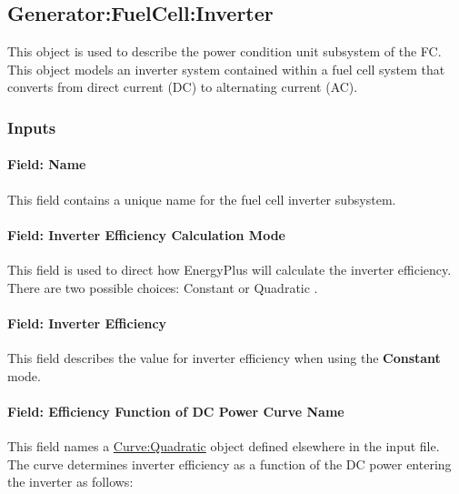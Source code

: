 \subsection{Generator:FuelCell:Inverter}\label{generatorfuelcellinverter}

This object is used to describe the power condition unit subsystem of the FC. This object models an inverter system contained within a fuel cell system that converts from direct current (DC) to alternating current (AC).

\subsubsection{Inputs}\label{inputs-18-000}

\paragraph{Field: Name}\label{field-name-21}

This field contains a unique name for the fuel cell inverter subsystem.

\paragraph{Field: Inverter Efficiency Calculation Mode}\label{field-inverter-efficiency-calculation-mode}

This field is used to direct how EnergyPlus will calculate the inverter efficiency. There are two possible choices: Constant or Quadratic .

\paragraph{Field: Inverter Efficiency}\label{field-inverter-efficiency-1}

This field describes the value for inverter efficiency when using the \textbf{Constant} mode.

\paragraph{Field: Efficiency Function of DC Power Curve Name}\label{field-efficiency-function-of-dc-power-curve-name}

This field names a \hyperref[curvequadratic]{Curve:Quadratic} object defined elsewhere in the input file. The curve determines inverter efficiency as a function of the DC power entering the inverter as follows:

